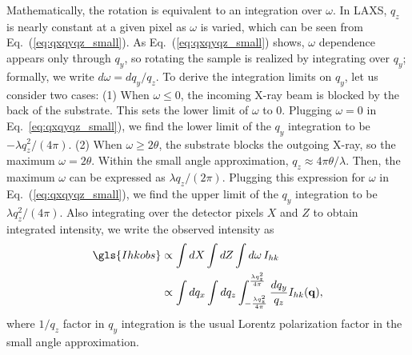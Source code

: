 Mathematically, the rotation is  
equivalent to an integration over $\omega$. In LAXS, 
$q_z$ is nearly constant at a given pixel as $\omega$ is varied, 
which can be seen from 
Eq.~(\ref{eq:qxqyqz_small}). As Eq.~(\ref{eq:qxqyqz_small}) shows, 
$\omega$ dependence appears only through $q_y$, 
so rotating the sample is realized by integrating over $q_y$;
formally, we write $d\omega=dq_y/q_z$.
To derive the integration limits on $q_y$, let us consider two cases: 
(1) When $\omega \leq 0$,
the incoming X-ray beam is blocked by the back of the substrate. This sets 
the lower limit of $\omega$ to 0. Plugging $\omega=0$ in Eq.~\ref{eq:qxqyqz_small}),
we find the lower limit of the $q_y$ integration to be $-\lambda q_z^2/(4\pi)$.
(2) When $\omega \geq 2\theta$, the substrate blocks 
the outgoing X-ray, so the maximum $\omega = 2\theta$. 
Within the small angle approximation, $q_z \approx 4\pi\theta/\lambda$. 
Then, the maximum $\omega$ can be expressed as $\lambda q_z/(2\pi)$.
Plugging this expression for $\omega$ in Eq.~(\ref{eq:qxqyqz_small}),
we find the upper limit of the $q_y$ integration to be $\lambda q_z^2/(4\pi)$.
Also integrating over the detector pixels $X$ and $Z$ to obtain integrated intensity, 
we write the observed intensity as
\begin{align}
  \gls{Ihkobs} 
    &\propto \int dX \int dZ \int \mathop{d\omega} I_{hk} \nonumber \\
    &\propto \int dq_x \int dq_z 
             \int_{-\frac{\lambda q_z^2}{4\pi}}^{\frac{\lambda q_z^2}{4\pi}} 
             \frac{dq_y}{q_z} 
             I_{hk}(\mathbf{q}),
  \label{eq:I_obs_general}
\end{align}
where $1/q_z$ factor in $q_y$ integration is the usual Lorentz polarization factor
in the small angle approximation. 

